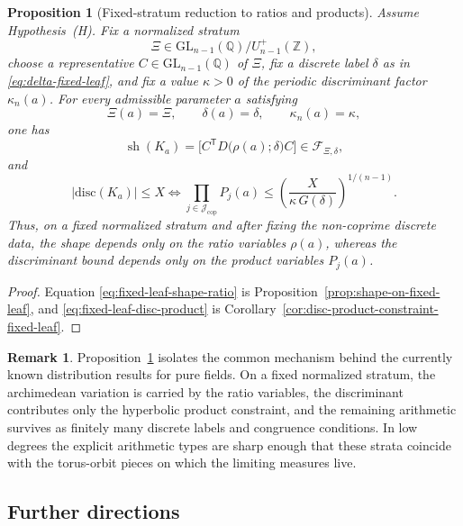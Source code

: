 \documentclass[11pt,letterpaper]{amsart}
\newcommand{\Q}{\mathbb{Q}}
\newcommand{\Z}{\mathbb{Z}}
\newcommand{\GL}{\mathrm{GL}}
\newcommand{\disc}{\mathrm{disc}}
\theoremstyle{plain}
\newtheorem{proposition}[theorem]{Proposition}
\theoremstyle{definition}
\newtheorem{remark}[theorem]{Remark}
\begin{document}
\begin{proposition}[Fixed-stratum reduction to ratios and products]
\label{prop:fixed-leaf-counting-mechanism}
Assume Hypothesis~\textup{(H)}.
Fix a normalized stratum
\[
\Xi\in \GL_{n-1}(\Q)/U_{n-1}^+(\Z),
\]
choose a representative \(C\in \GL_{n-1}(\Q)\) of \(\Xi\), fix a discrete
label \(\delta\) as in \eqref{eq:delta-fixed-leaf}, and fix a value
\(\kappa>0\) of the periodic discriminant factor \(\kappa_n(a)\).
For every admissible parameter \(a\) satisfying
\[
\Xi(a)=\Xi,\qquad
\delta(a)=\delta,\qquad
\kappa_n(a)=\kappa,
\]
one has
\begin{equation}\label{eq:fixed-leaf-shape-ratio}
\operatorname{sh}(K_a)
=
\bigl[C^{\mathsf T}D\bigl(\rho(a);\delta\bigr)C\bigr]
\in \mathcal F_{\Xi,\delta},
\end{equation}
and
\begin{equation}\label{eq:fixed-leaf-disc-product}
|\disc(K_a)|\le X
\iff
\prod_{j\in \mathcal J_{\mathrm{cop}}}P_j(a)
\le
\left(\frac{X}{\kappa\,G(\delta)}\right)^{1/(n-1)}.
\end{equation}
Thus, on a fixed normalized stratum and after fixing the non-coprime discrete
data, the shape depends only on the ratio variables \(\rho(a)\), whereas the
discriminant bound depends only on the product variables \(P_j(a)\).
\end{proposition}

\begin{proof}
Equation \eqref{eq:fixed-leaf-shape-ratio} is
Proposition~\ref{prop:shape-on-fixed-leaf}, and
\eqref{eq:fixed-leaf-disc-product} is
Corollary~\ref{cor:disc-product-constraint-fixed-leaf}.
\end{proof}


\begin{remark}
\label{rem:low-degree-leafwise-mechanism}
Proposition~\ref{prop:fixed-leaf-counting-mechanism} isolates the common
mechanism behind the currently known distribution results for pure fields.
On a fixed normalized stratum, the archimedean variation is carried by the
ratio variables, the discriminant contributes only the hyperbolic product
constraint, and the remaining arithmetic survives as finitely many discrete
labels and congruence conditions.  In low degrees the explicit arithmetic types
are sharp enough that these strata coincide with the torus-orbit pieces on
which the limiting measures live.
\end{remark}

\subsection{Further directions}\label{sec:outlook-open-problems}
\end{document}
